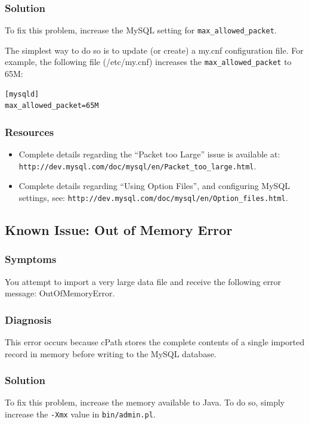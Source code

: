 \documentclass[letterpaper,12pt]{article}
\begin{document}
\subsubsection{Solution}
To fix this problem, increase the MySQL setting for \verb+max_allowed_packet+.

The simplest way to do so is to update (or create) a my.cnf configuration file.  For example, the following file (/etc/my.cnf) increases the \verb+max_allowed_packet+ to 65M:

\begin{verbatim}
[mysqld]
max_allowed_packet=65M
\end{verbatim}

\subsubsection{Resources}

\begin{itemize}

\item Complete details regarding the ``Packet too Large'' issue is available at:  \verb+http://dev.mysql.com/doc/mysql/en/Packet_too_large.html+.

\item Complete details regarding “Using Option Files”, and configuring MySQL settings, see: \verb+http://dev.mysql.com/doc/mysql/en/Option_files.html+.

\end{itemize}

\subsection{Known Issue: Out of Memory Error}

\subsubsection{Symptoms}
You attempt to import a very large data file and receive the following error message: OutOfMemoryError.

\subsubsection{Diagnosis}
This error occurs because cPath stores the complete contents of a single imported record in memory before writing to the MySQL database.

\subsubsection{Solution}
To fix this problem, increase the memory available to Java.   To do so, simply increase the \verb+-Xmx+ value in \verb+bin/admin.pl+.
\end{document}
